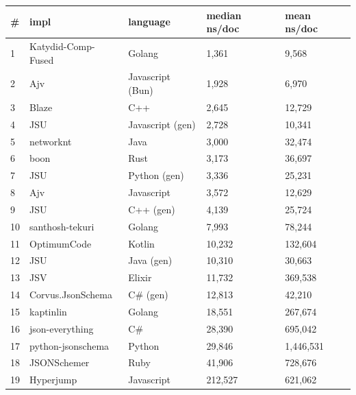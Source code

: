 \begin{tabular}{ll|l|ll}
\# & impl & language & median ns/doc & mean ns/doc \\
\hline
1 & Katydid-Comp-Fused & Golang & 1,361 & 9,568 \\
2 & Ajv & Javascript (Bun) & 1,928 & 6,970 \\
3 & Blaze & C++ & 2,645 & 12,729 \\
4 & JSU & Javascript (gen) & 2,728 & 10,341 \\
5 & networknt & Java & 3,000 & 32,474 \\
6 & boon & Rust & 3,173 & 36,697 \\
7 & JSU & Python (gen) & 3,336 & 25,231 \\
8 & Ajv & Javascript & 3,572 & 12,629 \\
9 & JSU & C++ (gen) & 4,139 & 25,724 \\
10 & santhosh-tekuri & Golang & 7,993 & 78,244 \\
11 & OptimumCode & Kotlin & 10,232 & 132,604 \\
12 & JSU & Java (gen) & 10,310 & 30,663 \\
13 & JSV & Elixir & 11,732 & 369,538 \\
14 & Corvus.JsonSchema & C\# (gen) & 12,813 & 42,210 \\
15 & kaptinlin & Golang & 18,551 & 267,674 \\
16 & json-everything & C\# & 28,390 & 695,042 \\
17 & python-jsonschema & Python & 29,846 & 1,446,531 \\
18 & JSONSchemer & Ruby & 41,906 & 728,676 \\
19 & Hyperjump & Javascript & 212,527 & 621,062 \\
\end{tabular}
